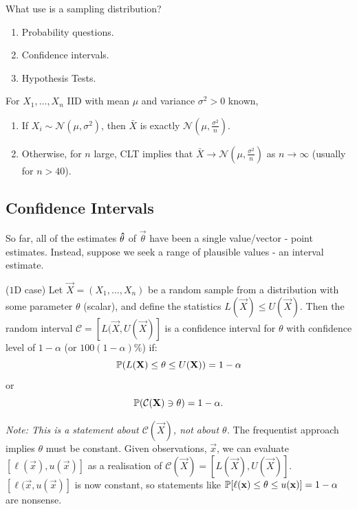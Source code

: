 \documentclass[10pt, a4paper]{article}
\begin{document}
What use is a sampling distribution?
\begin{enumerate}[label = (\roman*)]
    \item Probability questions.
    
    \item Confidence intervals.
    
    \item Hypothesis Tests.
\end{enumerate}

\begin{proposition}
    For $X_1, \dotsc, X_n$ IID with mean $\mu$ and variance $\sigma ^ 2 > 0$ known,
    \begin{enumerate}[label = (\roman*)]
        \item If $X_i \sim \mathcal{N}(\mu, \sigma ^ 2)$,
        then $\bar{X}$ is exactly $\mathcal{N}\left(\mu, \frac{\sigma ^ 2}{n}\right)$.

        \item
        Otherwise,
        for $n$ large,
        CLT implies that $\bar{X} \to \mathcal{N}\left(\mu, \frac{\sigma ^ 2}{n}\right)$ as $n \to \infty$
        (usually for $n > 40$).
    \end{enumerate}
\end{proposition}

\subsection{Confidence Intervals}
So far,
all of the estimates $\hvec{\theta}$ of $\vec{\theta}$ have been a single value/vector -
point estimates.
Instead,
suppose we seek a range of plausible values -
an interval estimate.

\begin{definition}
    ($1$D case)
    Let $\vec{X} = (X_1, \dotsc, X_n)$ be a random sample from a distribution with some parameter $\theta$
    (scalar),
    and define the statistics $L(\vec{X}) \leq U(\vec{X})$.
    Then the random interval $\mathcal{C} = [L(\vec{X}, U(\vec{X})]$ is a confidence interval for $\theta$ with confidence level of $1 - \alpha$
    (or $100(1 - \alpha)\%$)
    if:
    \[
    \P(L(\vec{X}) \leq \theta \leq U(\vec{X})) = 1 - \alpha
    \]
    or
    \[
    \P(\mathcal{C}(\vec{X}) \ni \theta) = 1 - \alpha.
    \]
\end{definition}
\textit{Note:
This is a statement about $\mathcal{C}(\vec{X})$,
not about $\theta$.}
The frequentist approach implies $\theta$ must be constant.
Given observations,
$\vec{x}$,
we can evaluate $[\ell(\vec{x}), u(\vec{x})]$ as a realisation of $\mathcal{C}(\vec{X}) = [L(\vec{X}), U(\vec{X})]$.
$[\ell(\vec{x}, u(\vec{x})]$ is now constant,
so statements like $\P[\ell(\vec{x}) \leq \theta \leq u(\vec{x})] = 1 - \alpha$ are nonsense.
\end{document}
